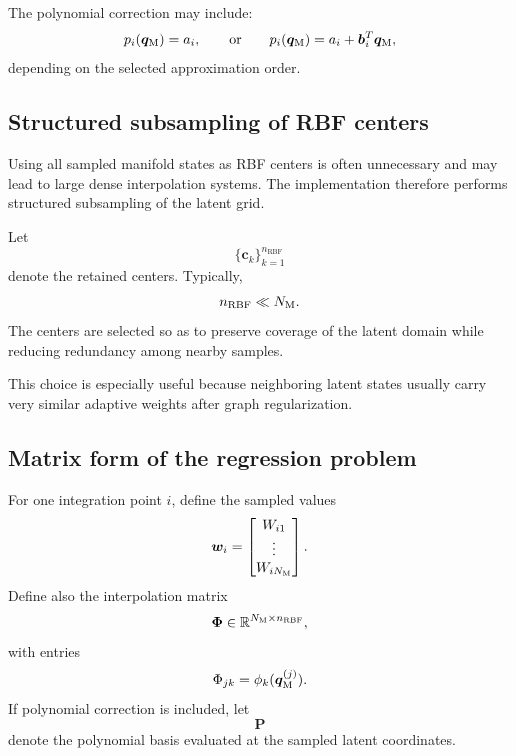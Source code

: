 \documentclass[11pt,a4paper]{article}
\begin{document}
The polynomial correction may include:
\[
        p_i(\bm q_{\mathrm{M}})
        =
        a_i,
        \qquad
        \text{or}
        \qquad
        p_i(\bm q_{\mathrm{M}})
        =
        a_i+\bm b_i^T\bm q_{\mathrm{M}},
\]
depending on the selected approximation order.

\subsection{Structured subsampling of RBF centers}

Using all sampled manifold states as RBF centers is often unnecessary and may
lead to large dense interpolation systems. The implementation therefore performs
structured subsampling of the latent grid.

Let
\[
        \{
        \bm c_k
        \}_{k=1}^{n_{\mathrm{RBF}}}
\]
denote the retained centers. Typically,
\[
        n_{\mathrm{RBF}}
        \ll
        N_{\mathrm{M}}.
\]
The centers are selected so as to preserve coverage of the latent domain while
reducing redundancy among nearby samples.

This choice is especially useful because neighboring latent states usually carry
very similar adaptive weights after graph regularization.

\subsection{Matrix form of the regression problem}

For one integration point $i$, define the sampled values
\[
        \bm w_i
        =
        \begin{bmatrix}
        W_{i1}\\
        \vdots\\
        W_{iN_{\mathrm{M}}}
        \end{bmatrix}.
\]
Define also the interpolation matrix
\[
        \bm\Phi
        \in
        \mathbb{R}^{N_{\mathrm{M}}\times n_{\mathrm{RBF}}},
\]
with entries
\[
        \Phi_{jk}
        =
        \phi_k(\bm q_{\mathrm{M}}^{(j)}).
\]
If polynomial correction is included, let
\[
        \bm P
\]
denote the polynomial basis evaluated at the sampled latent coordinates.
\end{document}
